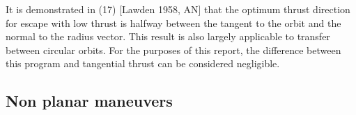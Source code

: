 \begin{displayquote}
It is demonstrated in (17) [Lawden 1958, AN] that the optimum thrust direction for escape with low thrust is halfway between the tangent to the orbit and the normal to the radius vector. This result is also largely applicable to transfer between circular orbits. For the purposes of this report, the difference between this program and tangential thrust can be considered negligible.
\end{displayquote}

\subsection{Non planar maneuvers} \label{metnonplanar}

\clearpage